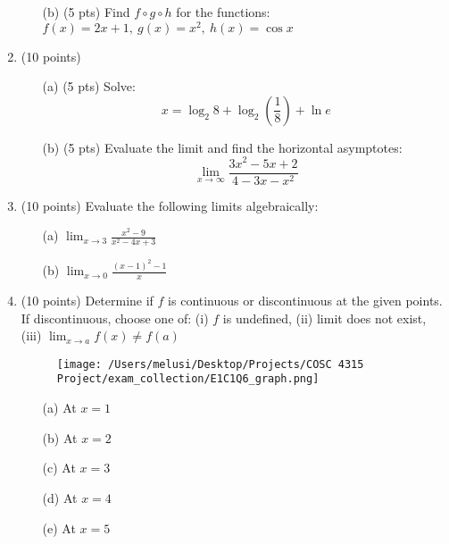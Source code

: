 \documentclass[12pt]{article}
\begin{document}
\begin{enumerate}
\begin{enumerate}
        \item [(b)] (5 pts) Find \( f \circ g \circ h \) for the functions: \\
        \( f(x) = 2x + 1,\ g(x) = x^2,\ h(x) = \cos x \)
    \end{enumerate}

    \item (10 points)
    \begin{enumerate}
        \item [(a)]  (5 pts) Solve:
        \[
        x = \log_2 8 + \log_2 \left(\frac{1}{8}\right) + \ln e
        \]

        \item [(b)] (5 pts) Evaluate the limit and find the horizontal asymptotes:
        \[
        \lim_{x \to \infty} \frac{3x^2 - 5x + 2}{4 - 3x - x^2}
        \]
    \end{enumerate}

    \item (10 points) Evaluate the following limits algebraically:
    \begin{enumerate}
        \item [(a)]  \( \lim_{x \to 3} \frac{x^2 - 9}{x^2 - 4x + 3} \)
        \item [(b)] \( \lim_{x \to 0} \frac{(x - 1)^2 - 1}{x} \)
    \end{enumerate}

    \item (10 points) Determine if \( f \) is continuous or discontinuous at the given points. If discontinuous, choose one of: 
    (i) \( f \) is undefined, 
    (ii) limit does not exist, 
    (iii) \( \lim_{x \to a} f(x) \neq f(a) \)

    \begin{figure}[ht!]
        \centering
        \texttt{[image: /Users/melusi/Desktop/Projects/COSC 4315 Project/exam\_collection/E1C1Q6\_graph.png]}
    \end{figure}

    \begin{itemize}
        \item [(a)] At \( x = 1 \)
        \item [(b)] At \( x = 2 \)
        \item [(c)] At \( x = 3 \)
        \item [(d)] At \( x = 4 \)
        \item [(e)] At \( x = 5 \)
    \end{itemize}


\end{enumerate}
\end{document}
